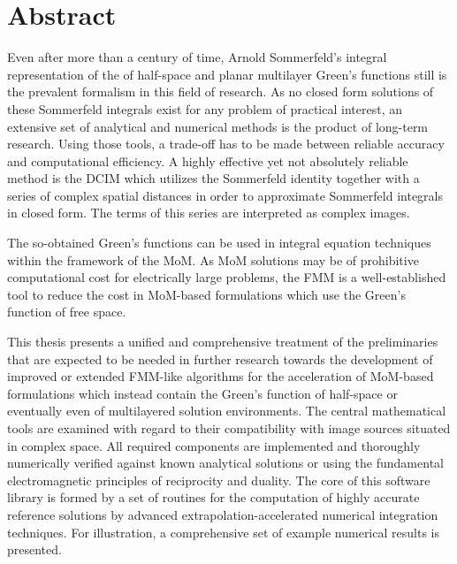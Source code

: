 \chapter*{Abstract}

Even after more than a century of time, Arnold Sommerfeld's integral
representation of the of half-space and planar multilayer Green's functions
still is the prevalent formalism in this field of research.
As no closed form solutions of these Sommerfeld integrals exist for any
problem of practical interest, an extensive set of analytical and numerical
methods is the product of long-term research.
Using those tools, a trade-off has to be made between reliable accuracy and
computational efficiency.
A highly effective yet not absolutely reliable method is the \ac{DCIM}
which utilizes the Sommerfeld identity together with a series of complex spatial
distances in order to approximate Sommerfeld integrals in closed form.
The terms of this series are interpreted as complex images.

The so-obtained Green's functions can be used in integral equation
techniques within the framework of the \ac{MoM}.
As \ac{MoM} solutions may be of prohibitive computational cost for electrically
large problems, the \ac{FMM} is a well-established tool to reduce the cost
in \ac{MoM}-based formulations which use the Green's function of free space.

This thesis presents a unified and comprehensive treatment of the preliminaries
that are expected to be needed in further research towards the development
of improved or extended \ac{FMM}-like algorithms for the acceleration of 
\ac{MoM}-based formulations which instead contain the Green's function of
half-space or eventually even of multilayered solution environments.
The central mathematical tools are examined with regard to their compatibility
with image sources situated in complex space.
All required components are implemented and thoroughly numerically verified
against known analytical solutions or using the fundamental electromagnetic
principles of reciprocity and duality.
The core of this software library is formed by a set of routines for the
computation of highly accurate reference solutions by
advanced extrapolation-accelerated numerical integration techniques.
For illustration, a comprehensive set of example numerical results is presented.

\acresetall
